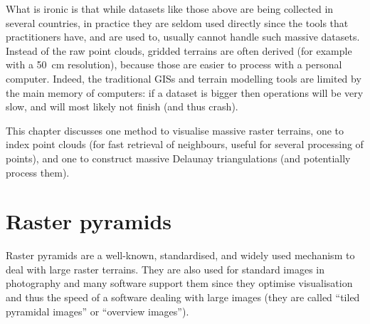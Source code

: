 %

What is ironic is that while datasets like those above are being collected in several countries, in practice they are seldom used directly since the tools that practitioners have, and are used to, usually cannot handle such massive datasets. 
Instead of the raw point clouds, gridded terrains are often derived (for example with a \qty{50}{cm} resolution), because those are easier to process with a personal computer.
Indeed, the traditional GISs and terrain modelling tools are limited by the main memory of computers: if a dataset is bigger then operations will be very slow, and will most likely not finish (and thus crash).

%

This chapter discusses one method to visualise massive raster terrains, one to index point clouds (for fast retrieval of neighbours, useful for several processing of points), and one to construct massive Delaunay triangulations (and potentially process them).



%
\section{Raster pyramids}%

Raster pyramids are a well-known, standardised, and widely used mechanism to deal with large raster terrains.
They are also used for standard images in photography and many software support them since they optimise visualisation and thus the speed of a software dealing with large images (they are called ``tiled pyramidal images'' or ``overview images'').

